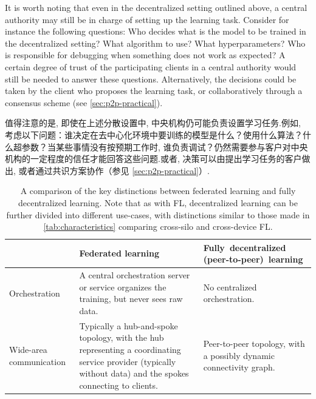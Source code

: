 It is worth noting that even in the decentralized setting outlined above, a central authority may still be in charge of setting up the learning task. Consider for instance the following questions: Who decides what is the model to be trained in the decentralized setting? What algorithm to use? What hyperparameters? Who is responsible for debugging when something does not work as expected? A certain degree of trust of the participating clients in a central authority would still be needed to answer these questions. Alternatively, the decisions could be taken by the client who proposes the learning task, or collaboratively through a consensus scheme (see \cref{sec:p2p-practical}).


值得注意的是, 即使在上述分散设置中, 中央机构仍可能负责设置学习任务.例如, 考虑以下问题：谁决定在去中心化环境中要训练的模型是什么？使用什么算法？什么超参数？当某些事情没有按预期工作时, 谁负责调试？仍然需要参与客户对中央机构的一定程度的信任才能回答这些问题.或者, 决策可以由提出学习任务的客户做出, 或者通过共识方案协作（参见 \cref{sec:p2p-practical}）.
\begin{table}
\begin{centering}
\renewcommand{\arraystretch}{1.5}
\begin{tabularx}{\textwidth}{lXX}
\toprule
       & \textbf{Federated learning} & \textbf{\mbox{Fully~decentralized} \mbox{(peer-to-peer) learning}} \\
\midrule 
Orchestration 
  & A central orchestration server or service organizes the training, but never sees raw data.
  & No centralized orchestration. \\
Wide-area communication 
  & Typically a hub-and-spoke topology, with the hub representing a coordinating service provider (typically without data) and the spokes connecting to clients. 
  & Peer-to-peer topology, with a possibly dynamic connectivity graph. \\
\bottomrule
\end{tabularx}
\caption{A comparison of the key distinctions between federated learning and fully decentralized learning. Note that as with FL, decentralized learning can be further divided into different use-cases, with distinctions similar to those made in \cref{tab:characteristics} comparing cross-silo and cross-device FL.}
\label{tab:decentralized}
\end{centering}
\end{table}

